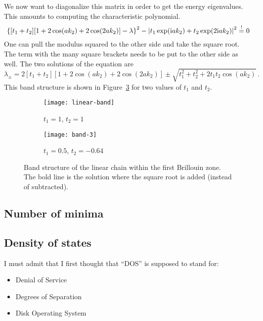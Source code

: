 \documentclass[11pt, english, fleqn, DIV=15, headinclude, BCOR=1cm]{scrartcl}
\begin{document}
We now want to diagonalize this matrix in order to get the energy eigenvalues.
This amounts to computing the characteristic polynomial.
\[
    \left\{ [t_1 + t_2][1 + 2 \cos(ak_2) + 2 \cos(2 ak_2)] - \lambda \right\}^2
    - \left| t_1 \exp(\mathrm i a k_2) + t_2 \exp(2 \mathrm i a k_2) \right|^2
    \overset != 0
\]
One can pull the modulus squared to the other side and take the square root.
The term with the many square brackets needs to be put to the other side as
well. The two solutions of the equation are
\[
    \lambda_\pm
    = 2 [t_1 + t_2][1 + 2 \cos(ak_2) + 2 \cos(2 ak_2)]
    \pm \sqrt{t_1^2 + t_2^2 + 2 t_1 t_2 \cos(ak_2)} \,.
\]
This band structure is shown in Figure~\ref{fig:linear-band} for two values of
$t_1$ and $t_2$.

\begin{figure}
    \begin{subfigure}[c]{0.5\linewidth}
        \centering
        \texttt{[image: linear-band]}
        \caption{%
            $t_1 = 1$, $t_2 = 1$
        }
        \label{fig:linear-band/1}
    \end{subfigure}
    \begin{subfigure}[c]{0.5\linewidth}
        \centering
        \texttt{[image: band-3]}
        \caption{%
            $t_1 = \num{0.5}$, $t_2 = \num{-0.64}$
        }
        \label{fig:linear-band/2}
    \end{subfigure}
    \caption{%
        Band structure of the linear chain within the first Brillouin zone. The
        bold line is the solution where the square root is added (instead of
        subtracted).
    }
    \label{fig:linear-band}
\end{figure}

\subsection{Number of minima}

\subsection{Density of states}

I must admit that I first thought that “DOS” is supposed to stand for:

\begin{itemize}
    \item Denial of Service
    \item Degrees of Separation
    \item Disk Operating System
\end{itemize}
\end{document}
